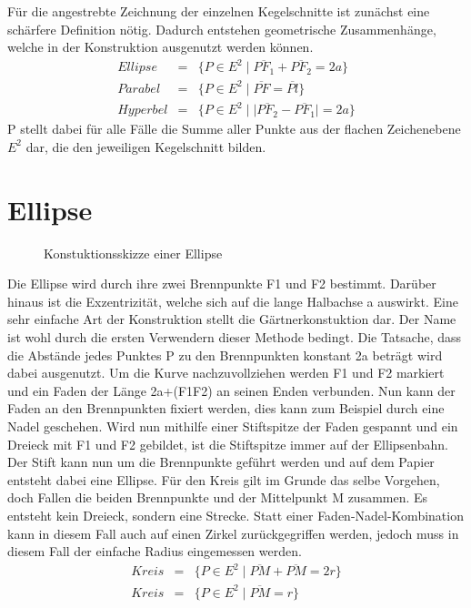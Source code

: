 \setcounter{section}{0}
Für die angestrebte Zeichnung der einzelnen Kegelschnitte ist zunächst eine schärfere Definition nötig. Dadurch entstehen geometrische Zusammenhänge, welche in der Konstruktion ausgenutzt werden können.
\begin{displaymath}
	\begin{array}{rcl}
		Ellipse  & = & \{P\in E^2\;|\;\overline{{PF}_1} + \overline{{PF}_2} = 2a\}\\
		Parabel  & = & \{P\in E^2\;|\;\overline{PF} = \overline{Pl}\}\\
		Hyperbel & = & \{P\in E^2\;|\;|\overline{{PF}_2} - \overline{{PF}_1}| = 2a\}
	\end{array}
\end{displaymath}
P stellt dabei für alle Fälle die Summe aller Punkte aus der flachen Zeichenebene $E^2$ dar, die den jeweiligen Kegelschnitt bilden.
\section{Ellipse}
\begin{figure}[h]
	\centering
		\resizebox{.5\linewidth}{!}{
			
		}
	\caption{Konstuktionsskizze einer Ellipse}
\end{figure}
Die Ellipse wird durch ihre zwei Brennpunkte F1 und F2 bestimmt. Darüber hinaus ist die Exzentrizität, welche sich auf die lange Halbachse a auswirkt.
Eine sehr einfache Art der Konstruktion stellt die Gärtnerkonstuktion dar. Der Name ist wohl durch die ersten Verwendern dieser Methode bedingt.
Die Tatsache, dass die Abstände jedes Punktes P zu den Brennpunkten konstant 2a beträgt wird dabei ausgenutzt. Um die Kurve nachzuvollziehen werden F1 und F2 markiert und ein Faden der Länge 2a+(F1F2) an seinen Enden verbunden. Nun kann der Faden an den Brennpunkten fixiert werden, dies kann zum Beispiel durch eine Nadel geschehen.
Wird nun mithilfe einer Stiftspitze der Faden gespannt und ein Dreieck mit F1 und F2 gebildet, ist die Stiftspitze immer auf der Ellipsenbahn. Der Stift kann nun um die Brennpunkte geführt werden und auf dem Papier entsteht dabei eine Ellipse.
Für den Kreis gilt im Grunde das selbe Vorgehen, doch Fallen die beiden Brennpunkte und der Mittelpunkt M zusammen. Es entsteht kein Dreieck, sondern eine Strecke. Statt einer Faden-Nadel-Kombination kann in diesem Fall auch auf einen Zirkel zurückgegriffen werden, jedoch muss in diesem Fall der einfache Radius eingemessen werden.
\begin{displaymath}
	\begin{array}{rcl}
		Kreis & = & \{P\in E^2\;|\;\overline{PM} + \overline{PM} = 2r\}\\
		Kreis & = & \{P\in E^2\;|\;\overline{PM} = r\}
	\end{array}
\end{displaymath}
